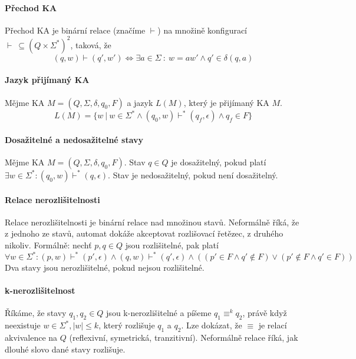\paragraph*{Přechod KA} Přechod KA je binární relace (značíme $\vdash$) na množině konfigurací $\vdash ~ \subseteq (Q \times \Sigma^*)^2$, taková, že $$(q, w) \vdash (q', w') \Leftrightarrow \exists a \in \Sigma ~:~ w = aw' \land q' \in \delta(q, a) $$


\paragraph*{Jazyk přijímaný KA} Mějme KA $M = (Q, \Sigma, \delta, q_0, F)$ a jazyk $L(M)$, který je přijímaný KA $M$. $$ L(M) = \{ w ~|~ w \in \Sigma^* \land (q_0, w) \vdash^* (q_f, \epsilon) \land q_f \in F \}$$

\paragraph*{Dosažitelné a nedosažitelné stavy} Mějme KA $M = (Q, \Sigma, \delta, q_0, F)$. Stav $q \in Q$ je dosažitelný, pokud platí $\exists w \in \Sigma^* : (q_0, w) \vdash^* (q, \epsilon)$. Stav je nedosažitelný, pokud není dosažitelný.

\paragraph*{Relace nerozlišitelnosti} Relace nerozlišitelnosti je binární relace nad množinou stavů. Neformálně říká, že z jednoho ze stavů, automat dokáže akceptovat rozlišovací řetězec, z druhého nikoliv. Formálně: nechť $p, q \in Q$ jsou rozlišitelné, pak platí $$ \forall w \in \Sigma^* : (p, w) \vdash^* (p', \epsilon) \land (q, w) \vdash^* (q', \epsilon) \land ( (p' \in F \land q' \not\in F) \lor (p' \not\in F \land q' \in F) ) $$ Dva stavy jsou nerozlišitelné, pokud nejsou rozlišitelné.

\paragraph*{k-nerozlišitelnost} Říkáme, že stavy $q_1, q_2 \in Q$ jsou k-nerozlišitelné a píšeme $q_1 \equiv^k q_2$, právě když neexistuje $w \in \Sigma^*, |w| \leq k$, který rozlišuje $q_1$ a $q_2$. Lze dokázat, že $\equiv$ je relací akvivalence na $Q$ (reflexivní, symetrická, tranzitivní). Neformálně relace říká, jak dlouhé slovo dané stavy rozlišuje.

